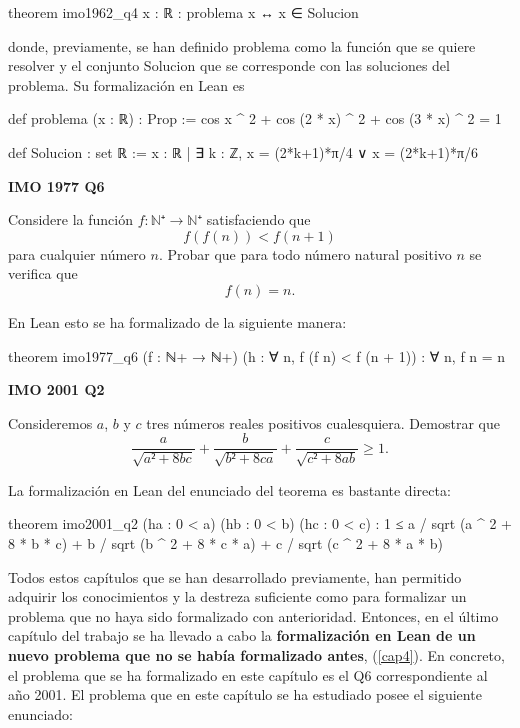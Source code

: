 \begin{leancode}
theorem imo1962_q4
  {x : ℝ}
  : problema x ↔ x ∈ Solucion
\end{leancode}
donde, previamente, se han definido problema como la función que se
quiere resolver y el conjunto Solucion que se corresponde con las
soluciones del problema. Su formalización en Lean es
\begin{leancode}
def problema (x : ℝ) : Prop :=
  cos x ^ 2 + cos (2 * x) ^ 2 + cos (3 * x) ^ 2 = 1

def Solucion : set ℝ :=
  {x : ℝ | ∃ k : ℤ, x = (2*k+1)*π/4 ∨ x = (2*k+1)*π/6}
\end{leancode}

\textbf{IMO 1977 Q6}

\noindent
Considere la función
\(f:ℕ⁺ → ℕ⁺\) satisfaciendo que
\[f(f(n)) < f(n+1)\]
para cualquier número \(n\). Probar que para todo número
natural positivo \(n\) se verifica que
\[f(n) = n.\]

En Lean esto se ha formalizado de la siguiente manera:
\begin{leancode}
theorem imo1977_q6
  (f : ℕ+ → ℕ+)
  (h : ∀ n, f (f n) < f (n + 1))
  : ∀ n, f n = n
\end{leancode}

\textbf{IMO 2001 Q2}

\noindent
Consideremos \(a\), \(b\) y \(c\) tres números reales positivos
cualesquiera. Demostrar que
\begin{equation*}
  \frac{a}{\sqrt{a²+8bc}} +
  \frac{b}{\sqrt{b²+8ca}} +
  \frac{c}{\sqrt{c²+8ab}} ≥ 1.
\end{equation*}

La formalización en Lean del enunciado del teorema es bastante directa:

\begin{leancode}
theorem imo2001_q2
  (ha : 0 < a)
  (hb : 0 < b)
  (hc : 0 < c)
  : 1 ≤ a / sqrt (a ^ 2 + 8 * b * c) +
        b / sqrt (b ^ 2 + 8 * c * a) +
        c / sqrt (c ^ 2 + 8 * a * b)
\end{leancode}



Todos estos capítulos que se han desarrollado previamente, han permitido
adquirir los conocimientos y la destreza suficiente como para formalizar un
problema que no haya sido formalizado con anterioridad. Entonces, en el último
capítulo del trabajo se ha llevado a cabo la \textbf{
formalización en Lean de un nuevo problema que no se había formalizado antes},
(\ref{cap4}). En concreto, el problema que se ha formalizado en este capítulo es
el Q6 correspondiente al año 2001. El problema que en este capítulo se ha
estudiado posee el siguiente enunciado:

